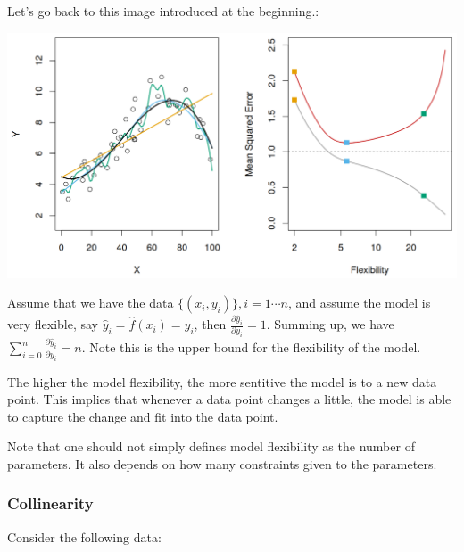 \documentclass{article}
\theoremstyle{MyNonumberplain}
\theoremstyle{break}
\newcommand{\pd}[2]{\frac{\partial {#1}}{\partial {#2}}}
\theoremstyle{break}
\begin{document}
Let's go back to this image introduced at the beginning.:

\begin{center}
    \includegraphics*[scale=0.3]{Images/img2.png}
\end{center}

Assume that we have the data $\bigl\{(x_i,y_i)\bigr\},i=1\cdots n$, and assume the model is very flexible, say $\hat y_i=\hat f(x_i)=y_i$,
then $\pd{\hat y_i}{y_i}=1$. Summing up, we have $\sum_{i=0}^n \pd{\hat y_i}{y_i}=n$. Note this is the upper bound for the flexibility of the model.

The higher the model flexibility, the more sentitive the model is to a new data point. This implies that whenever a data point changes a little, the model
is able to capture the change and fit into the data point.

Note that one should not simply defines model flexibility as the number of parameters. 
It also depends on how many constraints given to the parameters.

\subsubsection{Collinearity}

Consider the following data:
\end{document}
